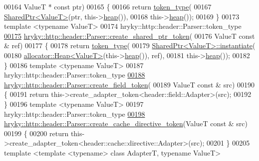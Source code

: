 \begin{DoxyCode}
00164     ValueT * \textcolor{keyword}{const} ptr)
00165 \{
00166     \textcolor{keywordflow}{return} \hyperlink{classhryky_1_1_vector}{token_type}(
00167         \hyperlink{classhryky_1_1_shared_ptr}{SharedPtr<ValueT>}(ptr, this->\hyperlink{namespacehryky_1_1memory_1_1global_a6fc6103f67c837aa0f39b359588409cd}{heap}()),
00168         this->\hyperlink{namespacehryky_1_1memory_1_1global_a6fc6103f67c837aa0f39b359588409cd}{heap}());
00169 \}
00173 \textcolor{keyword}{template} <\textcolor{keyword}{typename} ValueT>
00174 hryky::http::header::Parser::token\_type
\hypertarget{http__header__parser_8h_source_l00175}{}\hyperlink{classhryky_1_1http_1_1header_1_1_parser_a0d76245a0fba088b5d7f7baa7039f86b}{00175} \hyperlink{classhryky_1_1http_1_1header_1_1_parser_a0593e9a0e2cd945d715cfbaf0a3f2fdb}{hryky::http::header::Parser::create_shared_ptr_token}(
00176     ValueT \textcolor{keyword}{const} & ref)
00177 \{
00178     \textcolor{keywordflow}{return} \hyperlink{classhryky_1_1_vector}{token_type}(
00179         \hyperlink{classhryky_1_1_shared_ptr}{SharedPtr<ValueT>::instantiate}(
00180             \hyperlink{classhryky_1_1allocator_1_1_heap}{allocator::Heap<ValueT>}(this->\hyperlink{namespacehryky_1_1memory_1_1global_a6fc6103f67c837aa0f39b359588409cd}{heap}()), ref),
00181         this->\hyperlink{namespacehryky_1_1memory_1_1global_a6fc6103f67c837aa0f39b359588409cd}{heap}());
00182 \}
00186 \textcolor{keyword}{template} <\textcolor{keyword}{typename} ValueT>
00187 hryky::http::header::Parser::token\_type
\hypertarget{http__header__parser_8h_source_l00188}{}\hyperlink{classhryky_1_1http_1_1header_1_1_parser_a1c184592556a67601aa3d6195a746dfb}{00188} \hyperlink{classhryky_1_1http_1_1header_1_1_parser_a1c184592556a67601aa3d6195a746dfb}{hryky::http::header::Parser::create_field_token}(
00189     ValueT \textcolor{keyword}{const} & src)
00190 \{
00191     \textcolor{keywordflow}{return} this->create\_adapter\_token<header::field::Adapter>(src);
00192 \}
00196 \textcolor{keyword}{template} <\textcolor{keyword}{typename} ValueT>
00197 hryky::http::header::Parser::token\_type 
\hypertarget{http__header__parser_8h_source_l00198}{}\hyperlink{classhryky_1_1http_1_1header_1_1_parser_ab563791ae22360bf7490fceb952d7601}{00198} \hyperlink{classhryky_1_1http_1_1header_1_1_parser_ab563791ae22360bf7490fceb952d7601}{hryky::http::header::Parser::create_cache_directive_token}(ValueT \textcolor{keyword}{const} & src)
00199 \{
00200     \textcolor{keywordflow}{return} this->create\_adapter\_token<header::cache::directive::Adapter>(src);
00201 \}
00205 \textcolor{keyword}{template} <\textcolor{keyword}{template} <\textcolor{keyword}{typename}> \textcolor{keyword}{class }AdapterT, \textcolor{keyword}{typename} ValueT>

\end{DoxyCode}
